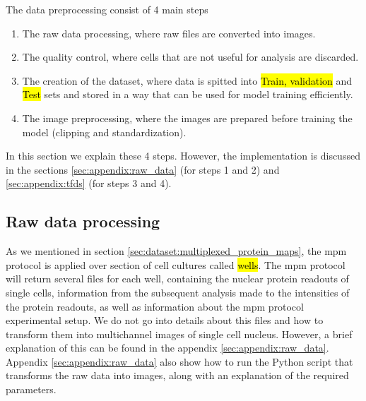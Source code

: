 
\glsresetall
\graphicspath{{./Sections/Dataset/Resources/}}

\noindent The data preprocessing consist of 4 main steps

\begin{enumerate}
  \item The raw data processing, where raw files are converted into images.
  \item The quality control, where cells that are not useful for analysis are discarded.
  \item The creation of the dataset, where data is spitted into \hl{Train, validation} and \hl{Test} sets and stored in a way that can be used for model training efficiently.
  \item The image preprocessing, where the images are prepared before training the model (clipping and standardization).
\end{enumerate}

In this section we explain these 4 steps. However, the implementation is discussed in the sections \ref{sec:appendix:raw_data} (for steps 1 and 2) and \ref{sec:appendix:tfds} (for steps 3 and 4).

\subsection{Raw data processing}
\label{sec:dataset:data_pp:raw_data_p}

As we mentioned in section \ref{sec:dataset:multiplexed_protein_maps}, the \gls{mpm} protocol is applied over section of cell cultures called \hl{wells}. The \gls{mpm} protocol will return several files for each well, containing the nuclear protein readouts of single cells, information from the subsequent analysis made to the intensities of the protein readouts, as well as information about the \gls{mpm} protocol experimental setup. We do not go into details about this files and how to transform them into multichannel images of single cell nucleus. However, a brief explanation of this can be found in the appendix \ref{sec:appendix:raw_data}. Appendix \ref{sec:appendix:raw_data} also show how to run the Python script that transforms the raw data into images, along with an explanation of the required parameters.

